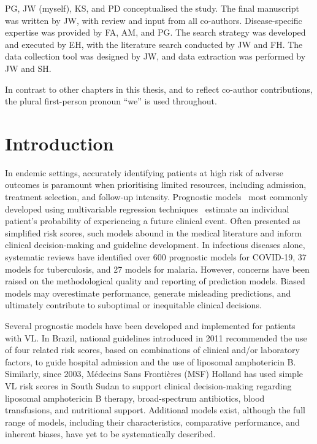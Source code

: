 PG, JW (myself), KS, and PD conceptualised the study. The final manuscript was written by JW, with review and input from all co-authors. Disease-specific expertise was provided by FA, AM, and PG. The search strategy was developed and executed by EH, with the literature search conducted by JW and FH. The data collection tool was designed by JW, and data extraction was performed by JW and SH.

In contrast to other chapters in this thesis, and to reflect co-author contributions, the plural first-person pronoun ``we'' is used throughout.

\section{Introduction}

In endemic settings, accurately identifying patients at high risk of adverse outcomes is paramount when prioritising limited resources, including admission, treatment selection, and follow-up intensity. Prognostic models \textemdash\ most commonly developed using multivariable regression techniques \textemdash\ estimate an individual patient's probability of experiencing a future clinical event\cite{moons2009}. Often presented as simplified risk scores, such models abound in the medical literature and inform clinical decision-making and guideline development\cite{moons2015}. In infectious diseases alone, systematic reviews have identified over 600 prognostic models for COVID-19\cite{wynants2020}, 37 models for tuberculosis\cite{peetluk2021}, and 27 models for malaria\cite{njim2019}. However, concerns have been raised on the methodological quality and reporting of prediction models. Biased models may overestimate performance, generate misleading predictions, and ultimately contribute to suboptimal or inequitable clinical decisions\cite{moons2015, steyerberg2013}.

Several prognostic models have been developed and implemented for patients with VL\cite{abongomeraDevelopmentExternalValidation2017,costaPredictingDeathKalaazar2016}. In Brazil, national guidelines introduced in 2011 recommended the use of four related risk scores, based on combinations of clinical and/or laboratory factors, to guide hospital admission and the use of liposomal amphotericin B\cite{costaPredictingDeathKalaazar2016,costadFatoresPrognosticoNa2009,ministryofhealthbrazilVisceralLeishmaniasisClinical2011}. Similarly, since 2003, Médecins Sans Frontières (MSF) Holland has used simple VL risk scores in South Sudan to support clinical decision-making regarding liposomal amphotericin B therapy, broad-spectrum antibiotics, blood transfusions, and nutritional support\cite{abongomeraDevelopmentExternalValidation2017,gorski2010,collin2004}. Additional models exist\cite{coura-vitalPrognosticFactorsScoring2014,werneckPrognosticFactorsDeath2003}, although the full range of models, including their characteristics, comparative performance, and inherent biases, have yet to be systematically described.

